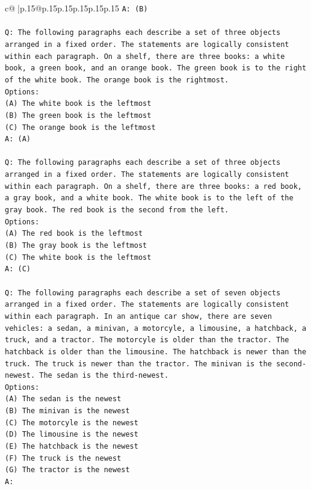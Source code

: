 \documentclass{article}
\begin{document}
{\begin{supertabular}{c@{$\;$}|p{.15\linewidth}@{}p{.15\linewidth}p{.15\linewidth}p{.15\linewidth}p{.15\linewidth}p{.15\linewidth}}
{{{\texttt{A: (B)} \\
\\ 
\texttt{Q: The following paragraphs each describe a set of three objects arranged in a fixed order. The statements are logically consistent within each paragraph. On a shelf, there are three books: a white book, a green book, and an orange book. The green book is to the right of the white book. The orange book is the rightmost.} \\
\texttt{Options:} \\
\texttt{(A) The white book is the leftmost} \\
\texttt{(B) The green book is the leftmost} \\
\texttt{(C) The orange book is the leftmost} \\
\texttt{A: (A)} \\
\\ 
\texttt{Q: The following paragraphs each describe a set of three objects arranged in a fixed order. The statements are logically consistent within each paragraph. On a shelf, there are three books: a red book, a gray book, and a white book. The white book is to the left of the gray book. The red book is the second from the left.} \\
\texttt{Options:} \\
\texttt{(A) The red book is the leftmost} \\
\texttt{(B) The gray book is the leftmost} \\
\texttt{(C) The white book is the leftmost} \\
\texttt{A: (C)} \\
\\ 
\texttt{Q: The following paragraphs each describe a set of seven objects arranged in a fixed order. The statements are logically consistent within each paragraph. In an antique car show, there are seven vehicles: a sedan, a minivan, a motorcyle, a limousine, a hatchback, a truck, and a tractor. The motorcyle is older than the tractor. The hatchback is older than the limousine. The hatchback is newer than the truck. The truck is newer than the tractor. The minivan is the second{-}newest. The sedan is the third{-}newest.} \\
\texttt{Options:} \\
\texttt{(A) The sedan is the newest} \\
\texttt{(B) The minivan is the newest} \\
\texttt{(C) The motorcyle is the newest} \\
\texttt{(D) The limousine is the newest} \\
\texttt{(E) The hatchback is the newest} \\
\texttt{(F) The truck is the newest} \\
\texttt{(G) The tractor is the newest} \\
\texttt{A:} \\
            }
        }
    }
     \\ \\


\end{supertabular}}
\end{document}
